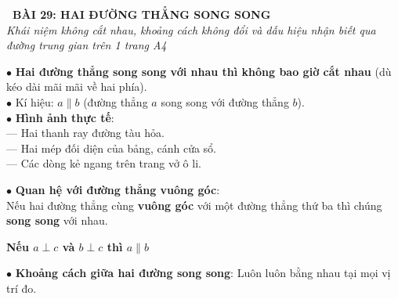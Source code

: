 \documentclass[14pt,a4paper,oneside]{extbook}
\begin{document}
\noindent
\begin{tcolorbox}[
  enhanced,
  colback=teal!8!white,
  colframe=teal!80!black,
  arc=3mm, boxrule=1pt,
  left=3mm, right=3mm, top=2mm, bottom=2mm,
  halign=center
]
  {\Large\bfseries\color{teal!90!black}\faBookmark\ BÀI 29: HAI ĐƯỜNG THẲNG SONG SONG}\\[1.5pt]
  {\footnotesize\itshape\color{black!75} Khái niệm không cắt nhau, khoảng cách không đổi và dấu hiệu nhận biết qua đường trung gian trên 1 trang A4}
\end{tcolorbox}

\vspace{2mm}

\noindent
\begin{minipage}[t]{0.49\textwidth}
  \begin{tcolorbox}[
    enhanced,
    title={\footnotesize\bfseries\color{white}\faArrowsH\ 1. Khái niệm hai đường thẳng song song},
    colback=blue!2!white,
    colframe=blue!75!black,
    arc=2.5mm, boxrule=0.8pt, top=1.8mm, bottom=1.8mm, left=2mm, right=2mm
  ]
    \footnotesize
    $\bullet$ \textbf{Hai đường thẳng song song với nhau thì không bao giờ cắt nhau} (dù kéo dài mãi mãi về hai phía).\\
    $\bullet$ Kí hiệu: $a \parallel b$ (đường thẳng $a$ song song với đường thẳng $b$).\\
    $\bullet$ \textbf{Hình ảnh thực tế}:\\
    --- Hai thanh ray đường tàu hỏa.\\
    --- Hai mép đối diện của bảng, cánh cửa sổ.\\
    --- Các dòng kẻ ngang trên trang vở ô li.
  \end{tcolorbox}
\end{minipage}%
\hfill
\begin{minipage}[t]{0.49\textwidth}
  \begin{tcolorbox}[
    enhanced,
    title={\footnotesize\bfseries\color{white}\faExchange\ 2. Dấu hiệu nhận biết quan trọng},
    colback=teal!2!white,
    colframe=teal!75!black,
    arc=2.5mm, boxrule=0.8pt, top=1.8mm, bottom=1.8mm, left=2mm, right=2mm
  ]
    \footnotesize
    $\bullet$ \textbf{Quan hệ với đường thẳng vuông góc}:\\
    Nếu hai đường thẳng cùng \textbf{vuông góc} với một đường thẳng thứ ba thì chúng \textbf{song song} với nhau.
    \begin{center}
      \textbf{Nếu $a \perp c$ và $b \perp c$ thì $a \parallel b$}
    \end{center}
    $\bullet$ \textbf{Khoảng cách giữa hai đường song song}: Luôn luôn bằng nhau tại mọi vị trí đo.
  \end{tcolorbox}
\end{minipage}
\end{document}
